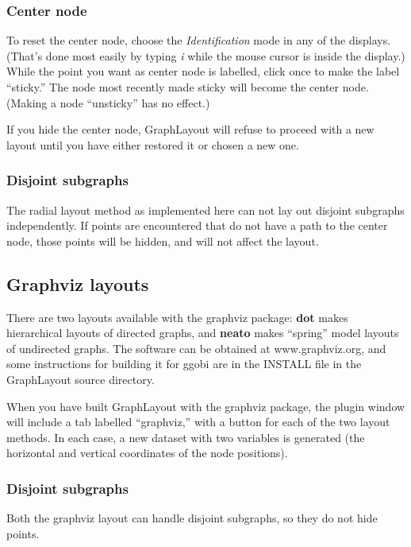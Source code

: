 \documentclass[11pt]{article}
\begin{document}
\subsubsection{Center node}

To reset the center node, choose the {\em Identification} mode in
any of the displays.  (That's done most easily by typing {\em i} while
the mouse cursor is inside the display.)  While the point you want
as center node is labelled, click once to make the label ``sticky.''
The node most recently made sticky will become the center node.
(Making a node ``unsticky'' has no effect.)

If you hide the center node, GraphLayout will refuse to proceed with
a new layout until you have either restored it or chosen a new one.

\subsubsection{Disjoint subgraphs}

The radial layout method as implemented here can not lay out
disjoint subgraphs independently.  If points are encountered that
do not have a path to the center node, those points will be hidden,
and will not affect the layout.

\subsection {Graphviz layouts}

There are two layouts available with the graphviz \cite{GansnerNorth00}
package:  {\bf dot} makes hierarchical layouts of directed graphs,
and {\bf neato} makes ``spring'' model layouts of undirected graphs.
The software can be obtained at www.graphviz.org, and some instructions
for building it for ggobi are in the INSTALL file in the GraphLayout
source directory.

When you have built GraphLayout with the graphviz package, the plugin
window will include a tab labelled ``graphviz,'' with a button for
each of the two layout methods.  In each case, a new dataset with two
variables is generated (the horizontal and vertical coordinates of
the node positions).

\subsubsection{Disjoint subgraphs}

Both the graphviz layout can handle disjoint subgraphs, so they
do not hide points.
\end{document}
